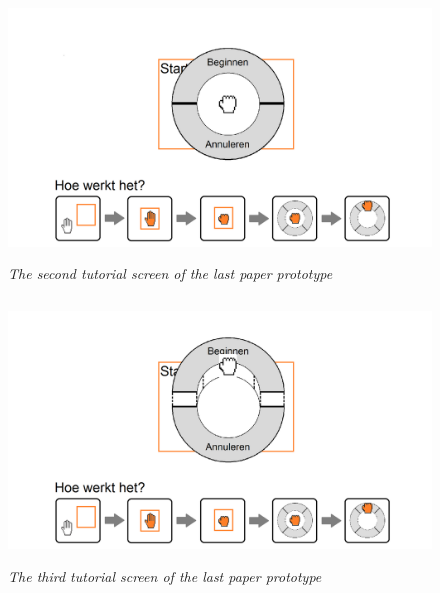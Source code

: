 \begin{figure}[H]
	\begin{center}
		\includegraphics[width=12.5cm, height=7cm]{figures/prototype_8_6_tutorial_2.png}
		\caption{\emph{The second tutorial screen of the last paper prototype}}
		\label{The second tutorial screen of the last paper prototype}
	\end{center}
\end{figure}

\begin{figure}[H]
	\begin{center}
		\includegraphics[width=12.5cm, height=7cm]{figures/prototype_9_6_tutorial_3.png}
		\caption{\emph{The third tutorial screen of the last paper prototype}}
		\label{The third tutorial screen of the last paper prototype}
	\end{center}
\end{figure}

